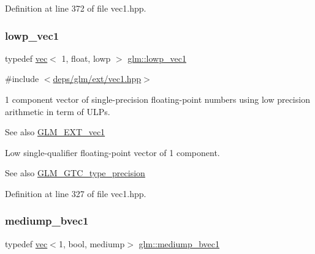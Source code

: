 Definition at line 372 of file vec1.\+hpp.

\mbox{\label{group__ext__vec1_gac40fba97d9ffbd2b3146d913d4ebc811}} 
\subsubsection{\texorpdfstring{lowp\+\_\+vec1}{lowp\_vec1}}
{\footnotesize\ttfamily typedef \hyperlink{structglm_1_1vec}{vec}$<$ 1, float, lowp $>$ \hyperlink{group__ext__vec1_gac40fba97d9ffbd2b3146d913d4ebc811}{glm\+::lowp\+\_\+vec1}}



{\ttfamily \#include $<$\hyperlink{ext_2vec1_8hpp}{deps/glm/ext/vec1.\+hpp}$>$}

1 component vector of single-\/precision floating-\/point numbers using low precision arithmetic in term of U\+L\+Ps.

\begin{DoxySeeAlso}{See also}
\hyperlink{group__ext__vec1}{G\+L\+M\+\_\+\+E\+X\+T\+\_\+vec1}
\end{DoxySeeAlso}
Low single-\/qualifier floating-\/point vector of 1 component. \begin{DoxySeeAlso}{See also}
\hyperlink{group__gtc__type__precision}{G\+L\+M\+\_\+\+G\+T\+C\+\_\+type\+\_\+precision} 
\end{DoxySeeAlso}


Definition at line 327 of file vec1.\+hpp.

\mbox{\label{group__ext__vec1_ga1e19a89e380de140b1496a824d306155}} 
\subsubsection{\texorpdfstring{mediump\+\_\+bvec1}{mediump\_bvec1}}
{\footnotesize\ttfamily typedef \hyperlink{structglm_1_1vec}{vec}$<$1, bool, mediump$>$ \hyperlink{group__ext__vec1_ga1e19a89e380de140b1496a824d306155}{glm\+::mediump\+\_\+bvec1}}



